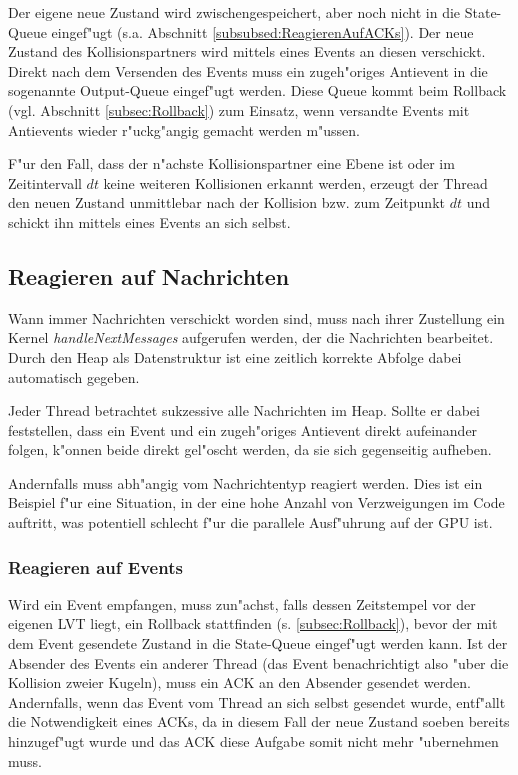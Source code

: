 \documentclass[a4paper, 10pt, openright, parskip, chapterprefix]{scrreprt}
\begin{document}
Der eigene neue Zustand wird zwischengespeichert, aber noch nicht in die State-Queue eingef"ugt (s.a. Abschnitt
\ref{subsubsed:ReagierenAufACKs}). Der neue
Zustand des Kollisionspartners wird mittels eines Events an diesen verschickt. Direkt nach dem Versenden des Events muss
ein zugeh"origes Antievent in die sogenannte Output-Queue eingef"ugt werden. Diese Queue kommt beim Rollback (vgl.
Abschnitt \ref{subsec:Rollback}) zum Einsatz, wenn versandte Events mit Antievents wieder r"uckg"angig gemacht werden
m"ussen.

F"ur den Fall, dass der n"achste Kollisionspartner eine Ebene ist oder im Zeitintervall $dt$ keine weiteren Kollisionen
erkannt werden, erzeugt der Thread den neuen Zustand unmittlebar nach der Kollision bzw. zum Zeitpunkt $dt$ und schickt
ihn mittels eines Events an sich selbst.

\subsection{Reagieren auf Nachrichten}
Wann immer Nachrichten verschickt worden sind, muss nach ihrer Zustellung ein Kernel \emph{handleNextMessages} aufgerufen werden, der die
Nachrichten bearbeitet. Durch den Heap als Datenstruktur ist eine zeitlich korrekte Abfolge dabei automatisch gegeben.

Jeder Thread betrachtet sukzessive alle Nachrichten im Heap. Sollte er dabei feststellen, dass ein Event und ein
zugeh"origes Antievent direkt aufeinander folgen, k"onnen beide direkt gel"oscht werden, da sie sich gegenseitig
aufheben.

Andernfalls muss abh"angig vom Nachrichtentyp reagiert werden. Dies ist ein Beispiel f"ur eine Situation, in der eine
hohe Anzahl von Verzweigungen im Code auftritt, was potentiell schlecht f"ur die parallele Ausf"uhrung auf der GPU ist.

\subsubsection{Reagieren auf Events}
Wird ein Event empfangen, muss zun"achst, falls dessen Zeitstempel vor der eigenen LVT liegt, 
ein Rollback stattfinden (s. \ref{subsec:Rollback}), bevor der mit dem Event gesendete
Zustand in die State-Queue eingef"ugt werden kann. Ist der Absender des Events ein anderer Thread (das Event
benachrichtigt also "uber die Kollision zweier Kugeln), muss ein ACK an den Absender gesendet werden. Andernfalls, wenn
das Event vom Thread an sich selbst gesendet wurde, entf"allt die Notwendigkeit eines ACKs, da in diesem Fall der neue Zustand soeben
bereits hinzugef"ugt wurde und das ACK diese Aufgabe somit nicht mehr "ubernehmen muss.
\end{document}
